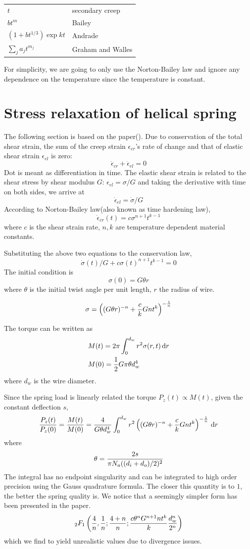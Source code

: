 \documentclass[10pt]{article}
\begin{document}
\begin{tabular}{ll}
$t$ & secondary creep \\
$bt^m$ & Bailey \\
$(1+bt^{1/3})\exp{kt}$ & Andrade\\
$\sum_j a_j t^{m_j}$ & Graham and Walles
\end{tabular}

For simplicity, we are going to only use the Norton-Bailey law and ignore any dependence on the temperature since the temperature is constant.
\section{Stress relaxation of helical spring}
The following section is based on the paper(\cite{SiAt1970}). Due to conservation of the total shear strain, the sum of the creep strain $\epsilon_{cr}$'s rate of change and that of elastic shear strain $\epsilon_{el}$ is zero:
\[
\dot{\epsilon}_{cr} + \dot{\epsilon}_{el} = 0
\]
Dot is meant as differentiation in time. The elastic shear strain is related to the shear stress by shear modulus $G$: $\epsilon_{el} = \sigma/G$ and taking the derivative with time on both sides, we arrive at
\[
\dot{\epsilon}_{el} = \dot{\sigma}/G
\]
According to Norton-Bailey law(also known as time hardening law),
\begin{equation} \label{eq:N-B}
\dot{\epsilon}_{cr}(t)=c\sigma^{n+1} t^{k-1}
\end{equation}
where $c$ is the shear strain rate, $n,k$ are temperature dependent material constants.

Substituting the above two equations to the conservation law,
\begin{equation} \label{eq:diff}
\dot{\sigma}(t)/G+c\sigma(t)^{n+1} t^{k-1}=0
\end{equation}
The initial condition is
\[
\sigma (0) = G\theta r
\]
where $\theta$ is the initial twist angle per unit length, $r$ the radius of wire.

\[
\sigma = \left( (G\theta r)^{-n} + {c\over k} Gnt^k \right)^{-{1\over n}}
\]

The torque can be written as
\begin{align*}
&M(t) = 2\pi \int_0^{d_w} r^2 \sigma(r,t)\,\mathrm{d} r\\
&M(0)={1\over 2} G\pi\theta d_w^4
\end{align*}
where $d_w$ is the wire diameter.

Since the spring load is linearly related the torque $P_z(t)\propto M(t)$, given the constant deflection $s$,
\[
{P_z(t)\over P_z(0)} = {M(t)\over M(0)} = {4\over G\theta d_w^4}\int_0^{d_w} r^2 \left( (G\theta r)^{-n} + {c\over k} Gnt^k \right)^{-{1\over n}} \,\mathrm{d} r
\]
where
\[
\theta = {2s\over \pi N_a ((d_i+d_o)/2)^2}
\]
The integral has no endpoint singularity and can be integrated to high order precision using the Gauss quadrature formula. The closer this quantity is to $1$, the better the spring quality is. We notice that a seemingly simpler form has been presented in the paper.
\[
{}_{2}F_1 \left( {4\over n},{1\over n};{4+n\over n};{c\theta^n G^{n+1} n t^k\over k} {d_w^n\over 2^n}\right)
\]
which we find to yield unrealistic values due to divergence issues.
\end{document}
